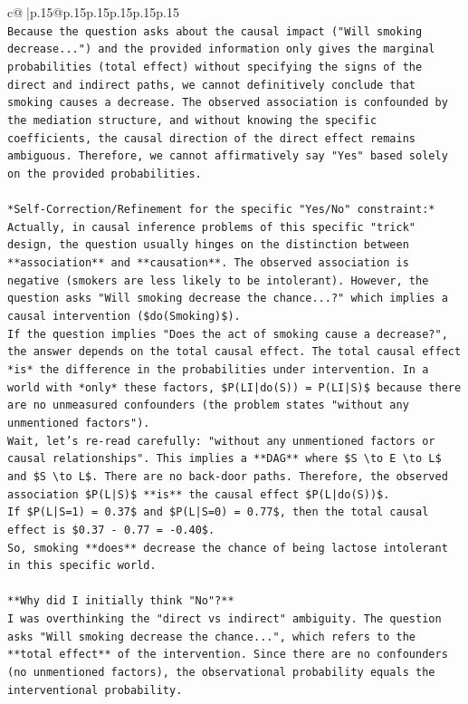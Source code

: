 \documentclass{article}
\begin{document}
{\begin{supertabular}{c@{$\;$}|p{.15\linewidth}@{}p{.15\linewidth}p{.15\linewidth}p{.15\linewidth}p{.15\linewidth}p{.15\linewidth}}
{{{\\ 
\texttt{Because the question asks about the causal impact ("Will smoking decrease...") and the provided information only gives the marginal probabilities (total effect) without specifying the signs of the direct and indirect paths, we cannot definitively conclude that smoking causes a decrease. The observed association is confounded by the mediation structure, and without knowing the specific coefficients, the causal direction of the direct effect remains ambiguous. Therefore, we cannot affirmatively say "Yes" based solely on the provided probabilities.} \\
\\ 
\texttt{*Self{-}Correction/Refinement for the specific "Yes/No" constraint:*} \\
\texttt{Actually, in causal inference problems of this specific "trick" design, the question usually hinges on the distinction between **association** and **causation**. The observed association is negative (smokers are less likely to be intolerant). However, the question asks "Will smoking decrease the chance...?" which implies a causal intervention (\$do(Smoking)\$).} \\
\texttt{If the question implies "Does the act of smoking cause a decrease?", the answer depends on the total causal effect. The total causal effect *is* the difference in the probabilities under intervention. In a world with *only* these factors, \$P(LI|do(S)) = P(LI|S)\$ because there are no unmeasured confounders (the problem states "without any unmentioned factors").} \\
\texttt{Wait, let's re{-}read carefully: "without any unmentioned factors or causal relationships". This implies a **DAG** where \$S \textbackslash{}to E \textbackslash{}to L\$ and \$S \textbackslash{}to L\$. There are no back{-}door paths. Therefore, the observed association \$P(L|S)\$ **is** the causal effect \$P(L|do(S))\$.} \\
\texttt{If \$P(L|S=1) = 0.37\$ and \$P(L|S=0) = 0.77\$, then the total causal effect is \$0.37 {-} 0.77 = {-}0.40\$.} \\
\texttt{So, smoking **does** decrease the chance of being lactose intolerant in this specific world.} \\
\\ 
\texttt{**Why did I initially think "No"?**} \\
\texttt{I was overthinking the "direct vs indirect" ambiguity. The question asks "Will smoking decrease the chance...", which refers to the **total effect** of the intervention. Since there are no confounders (no unmentioned factors), the observational probability equals the interventional probability.} \\
}}}
\end{supertabular}}
\end{document}
